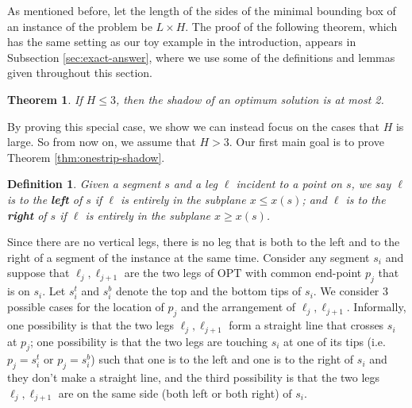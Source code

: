 \documentclass[10pt,a4paper]{amsart}
\theoremstyle{thmstyleone}
\newtheorem{theorem}{Theorem}
\newtheorem{definition}{Definition} %
\newcommand{\OPT}{{\text{OPT}}}
\begin{document}
As mentioned before, let the length of the sides of the minimal bounding box of an instance of the problem be $ L\times H $. 
The proof of the following theorem, which has the same setting as our toy example in the introduction, appears in Subsection \ref{sec:exact-answer}, where we use some of the definitions and lemmas given throughout this section. 
\begin{theorem}\label{thm:exact-answer}
    If $ H \le 3 $, then the shadow of an optimum solution is at most 2.
\end{theorem}

By proving this special case, we show we can instead focus on the cases that $H$ is large. So from now on, we assume that $ H > 3 $. Our first main goal is to prove Theorem \ref{thm:onestrip-shadow}. 

\begin{definition}\label{def:right-left}
    Given a segment $s$ and a leg $\ell$ incident to a point on $s$, we say
	$\ell$ is to the \textbf{left} of $s$ if $ \ell $ is entirely in the subplane $x \leq x(s)$; and
	$ \ell $ is to the \textbf{right} of $s$ if $ \ell $ is entirely in the subplane $x \ge x(s)$. 
\end{definition}
Since there are no vertical legs, there is no leg that is both to the left and to the right of a segment of the instance at the same time.
Consider any segment $s_i$  and suppose that $\ell_{j},\ell_{j+1}$ are the two legs of $\OPT$ with common end-point $p_j$ that is on $s_i$. 
Let $ s_i^t $ and $ s_i^b $ denote the top and the bottom tips of $s_i$. 
We consider 3 possible cases for the location of $p_j$ and the arrangement of $\ell_j,\ell_{j+1}$. Informally, one possibility is that the two legs $\ell_{j},\ell_{j+1}$ form a straight line that crosses $s_i$ at $p_j$; one possibility is that the two legs are touching $s_i$ at one of its tips (i.e. $p_j=s_i^t$ or $p_j=s_i^b$) such that one is to the left and one is to the right of $s_i$ and they don't make a straight line, and the third possibility is that the two legs $\ell_j,\ell_{j+1}$ are on the same side (both left or both right) of $s_i$. 
\end{document}
